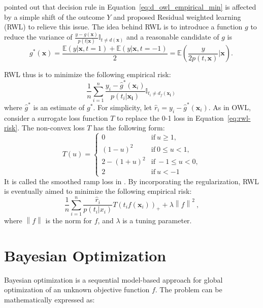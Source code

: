 \documentclass{article}
\begin{document}
\cite{Zhou_undated-ps} pointed out that decision rule in
Equation~\ref{eq:d_owl_empirical_min} is
affected by a simple shift of the outcome $Y$ and proposed Residual
weighted learning (RWL) to relieve this issue. The idea behind RWL is
to introduce a function $g$ to reduce the variance of
$\frac{y-g(\mathbf{x})}{p(t|\mathbf{x})}\mathbb{I}_{t \neq
  d(\mathbf{x})}$ and a reasonable candidate of $g$ is
\begin{equation}
  g^{*}(\mathbf{x}) = \frac{\mathbb{E}(y|\mathbf{x},
    t=1)+\mathbb{E}(y|\mathbf{x}, t=-1)}{2} = \mathbb{E} \left (
    \frac{y}{2p(t, \mathbf{x})} | \mathbf{x} \right ).~\label{eq:g-choice}
\end{equation}

RWL thus is to minimize the following empirical risk:
\begin{equation}
   \frac{1}{n}\sum_{i=1}^{n}\frac{y_i-\hat{g}^{*}(\mathbf{x}_i)}{p(t_i|\mathbf{x_i})}\mathbb{I}_{t_i \neq
    d_f(\mathbf{x_i})}
  ~\label{eq:rwl-risk}
\end{equation}
where $\hat{g}^{*}$ is an estimate of $g^{*}$. For simplicity, let
$\hat{r}_i = y_i - \hat{g}^{*}(\mathbf{x}_i)$. As in OWL,
\cite{Zhou_undated-ps} consider a surrogate loss function $T$ to replace
the 0-1 loss in Equation~\ref{eq:rwl-risk}. The non-convex loss $T$
has the following form:
\begin{equation}
T(u) =  \left\{\begin{array}{ll}
 0 & \mathrm{if} \: u \geq 1, \\ 
 (1-u)^2 & \mathrm{if} \: 0 \leq u < 1, \\ 
 2-(1+u)^2 & \mathrm{if} \: -1 \leq u < 0, \\ 
 2 & \mathrm{if} \: u < -1
\end{array}\right.
\end{equation}
It is called the smoothed ramp loss in \cite{Zhou_undated-ps}. By
incorporating the regularization, RWL is eventually aimed to minimize
the following empirical risk:
\begin{equation}
    \frac{1}{n}\sum_{i=1}^{n}\frac{\hat{r}_i}{p(t_i|x_i)}T(t_if(\mathbf{x}_i))_{+}+\lambda\left
    \| f \right \|^2 ~\label{eq:d_owl_empirical_min},
\end{equation}
where $\left \| f \right \|$ is the norm for $f$, and $\lambda$ is a
tuning parameter.
\section{Bayesian Optimization}
Bayesian optimization is a sequential model-based approach for global
optimization of an unknown objective function $f$. The problem can be
mathematically expressed as:
\end{document}
